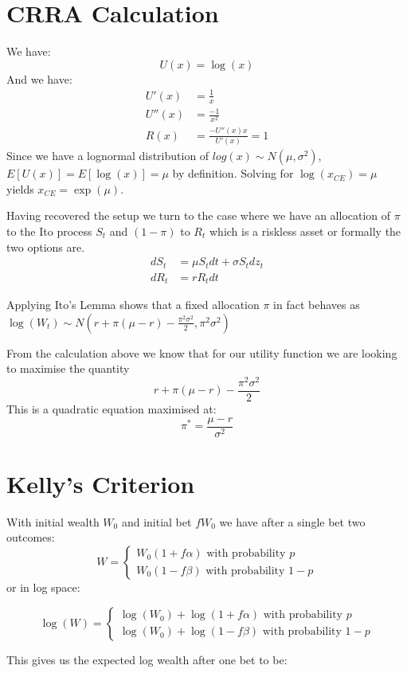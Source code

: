 \documentclass{article}[12pt]
\begin{document}
\section{CRRA Calculation}
We have:
$$ U(x) = \log(x)$$
And we have:
\begin{align*}
U'(x) &= \frac{1}{x}\\
U''(x) &= \frac{-1}{x^2}\\
R(x) &= \frac{-U''(x)x}{U'(x)} = 1
\end{align*}
Since we have a lognormal distribution of $log(x) \sim N(\mu,\sigma^2)$, $E[U(x)] = E[\log(x)] = \mu$ by definition. Solving for $\log(x_{CE}) = \mu$ yields $x_{CE} = \exp(\mu)$.

Having recovered the setup we turn to the case where we have an allocation of $\pi$ to the Ito process $S_t$ and $(1-\pi)$ to $R_t$ which is a riskless asset or formally the two options are.
\begin{align*}
dS_t &= \mu S_t dt+ \sigma S_t dz_t\\
dR_t &= r R_t dt
\end{align*} 

Applying Ito's Lemma shows that a fixed allocation $\pi$ in fact behaves as $\log(W_t) \sim N(r+\pi(\mu-r) - \frac{\pi^2\sigma^2}{2}, \pi^2\sigma^2)$

From the calculation above we know that for our utility function we are looking to maximise the quantity
$$r+\pi(\mu-r) - \frac{\pi^2\sigma^2}{2}$$
This is a quadratic equation maximised at:
$$\pi^* = \frac{\mu-r}{\sigma^2}$$

\section{Kelly's Criterion}
With initial wealth $W_0$ and initial bet $fW_0$ we have after a single bet two outcomes:
$$ W = \begin{cases}W_0(1+f\alpha)  \text{  with probability $p$}\\W_0(1-f\beta) \text{  with probability $1-p$} \end{cases}$$
or in log space:

$$ \log(W) = \begin{cases}\log(W_0) + \log(1+f\alpha)  \text{  with probability $p$}\\ \log(W_0)+ \log(1-f\beta) \text{  with probability $1-p$} \end{cases}$$

This gives us the expected log wealth after one bet to be:
\end{document}
